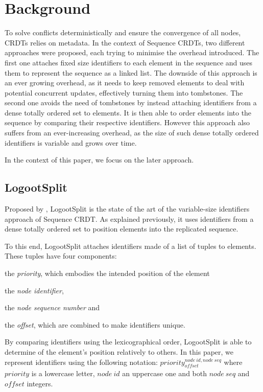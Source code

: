 \documentclass[sigplan,10pt]{acmart}
\newcommand{\trm}[1]{\mathit{#1}}
\newcommand{\id}[4]{$\trm{#1}^{\trm{#2}, \trm{#3}}_{\trm{#4}}$}
\begin{document}
\section{Background}
\label{sec:background}

To solve conflicts deterministically and ensure the convergence of all nodes, \acp{CRDT} relies on metadata.
In the context of Sequence \acp{CRDT}, two different approaches were proposed, each trying to minimise the overhead introduced.
The first one \cite{oster:inria-00108523, ROH2011354,briot:hal-01343941} attaches fixed size identifiers to each element in the sequence and uses them to represent the sequence as a linked list.
The downside of this approach is an ever growing overhead, as it needs to keep removed elements to deal with potential concurrent updates, effectively turning them into tombstones.
The second one \cite{5158449,WeissICDCS09,AndreCollaborateCom2013} avoids the need of tombstones by instead attaching identifiers from a dense totally ordered set to elements.
It is then able to order elements into the sequence by comparing their respective identifiers.
However this approach also suffers from an ever-increasing overhead, as the size of such dense totally ordered identifiers is variable and grows over time.

In the context of this paper, we focus on the later approach.

\subsection{LogootSplit}

Proposed by \citet{AndreCollaborateCom2013}, LogootSplit is the state of the art of the variable-size identifiers approach of Sequence \ac{CRDT}.
As explained previously, it uses identifiers from a dense totally ordered set to position elements into the replicated sequence.

To this end, LogootSplit attaches identifiers made of a list of tuples to elements.
These tuples have four components:
\begin{enumerate*}
    \item the \emph{priority}, which embodies the intended position of the element
    \item the \emph{node identifier},
    \item the \emph{node sequence number} and
    \item the \emph{offset}, which are combined to make identifiers unique.
\end{enumerate*}
By comparing identifiers using the lexicographical order, LogootSplit is able to determine of the element's position relatively to others.
In this paper, we represent identifiers using the following notation: \id{priority}{node~id}{node~seq}{offset} where $\trm{priority}$ is a lowercase letter, $\trm{node~id}$ an uppercase one and both $\trm{node~seq}$ and $\trm{offset}$ integers.
\end{document}
